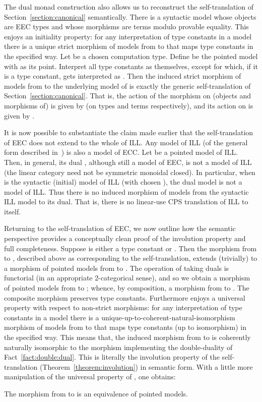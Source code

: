 \documentclass{LMCS}
\begin{document}
The dual monad construction also allows us to reconstruct the 
self-translation of Section~\ref{section:canonical} semantically.
There is a syntactic model  
whose objects are EEC types and whose morphisms are 
terms modulo provable equality. 
This enjoys an initiality property: for any interpretation
of type constants in a model   there is a unique
strict morphism of models from  to 
that maps type constants in the specified way. 
Let  be a chosen computation type.
Define  be the pointed model with  as 
its point.
Interpret
all type constants as themselves,  except for  which, if it is a type constant,
gets interpreted as . Then the induced strict morphism of  models
from  to the underlying model
of  is exactly the generic self-translation of 
Section~\ref{section:canonical}. That is, the action of the morphism 
on (objects and morphisms of)  is
given by  (on types and terms respectively), and its action on 
is given by .

It is now possible to substantiate the claim made earlier that the 
self-translation of EEC does not extend to the whole of ILL.
Any model of ILL (of the general form described in~\cite{Benton:95}) 
is also a model of ECC. Let  be a pointed model of ILL.
Then, in general, its dual , although still a model of EEC,
is not a model of ILL (the linear category need not be
symmetric monoidal closed). In particular, when  is the
syntactic (initial) model of ILL (with chosen ), the dual model
 is not a model of ILL.  Thus there is no induced morphism of models
from the syntactic ILL model to its dual. That is, there is no linear-use CPS
translation of ILL to itself.

Returning to the self-translation of EEC, we now outline how the semantic perspective
provides a conceptually clean proof of the involution property and full completeness.
Suppose  is either a type constant or . Then the
morphism from  to ,
described above as corresponding to the self-translation, extends (trivially) to a morphism
of pointed models from  to .
The operation of taking duals is functorial (in an appropriate 2-categorical sense), and so
we obtain a morphism of pointed models from 
 to ;
whence, by composition, a morphism from 
 to . 
The composite morphism preserves type constants. Furthermore 
enjoys a universal property with respect to non-strict morphisms: 
for any interpretation
of type constants in a model   there is a 
unique-up-to-coherent-natural-isomorphism 
morphism of models from  to 
that maps type constants (up to isomorphism) in the specified way. 
This means that, the induced morphism from  to 
 is coherently
naturally isomorphic to the morphism implementing the double-duality of Fact~\ref{fact:double:dual}.
This is literally the involution property of the self-translation (Theorem~\ref{theorem:involution}) in semantic form.
With a little more manipulation of the universal property
of , one obtains:
\begin{fact}
The morphism 
from  to  is an equivalence
of pointed models.
\end{fact}
\end{document}
